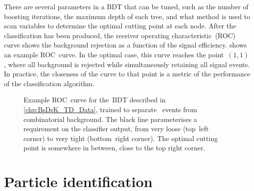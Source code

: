 There are several parameters in a BDT that can be tuned, such as the number of boosting iterations, the maximum depth of each tree, and what method is used to scan variables to determine the optimal cutting point at each node.
After the classification has been produced, the receiver operating characteristic~(ROC) curve shows the background rejection as a function of the signal efficiency.
 shows an example ROC~curve.
In the optimal case, this curve reaches the point~\({(1, 1)}\), where all background is rejected while simultaneously retaining all signal events.
In practice, the closeness of the curve to that point is a metric of the performance of the classification algorithm.
%
\begin{figure}[htb] \centerfloat
    \caption{
        Example ROC~curve for the~BDT described in \cref{chp:BsDsK_TD_Data}, trained to separate \BsDsPi~events from combinatorial background.
        The black line parameterises a requirement on the classifier output, from very loose (top~left corner) to very tight (bottom~right corner).
        The optimal cutting point is somewhere in between, close to the top right corner.}
    \label{fig:methods_ROCCurve}
\end{figure}

\clearpage
\section{Particle identification}
\label{sec:PID}

